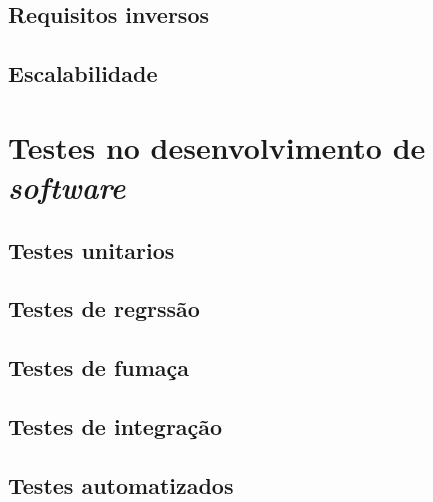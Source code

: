 \documentclass[]{../class/politex}
\begin{document}
      \section{Requisitos inversos}

      \section{Escalabilidade}

    \chapter{Testes no desenvolvimento de \textit{software}}

      \section{Testes unitarios}

      \section{Testes de regrssão}

      \section{Testes de fumaça}

      \section{Testes de integração}

      \section{Testes automatizados}

  

  

  

  
\end{document}
